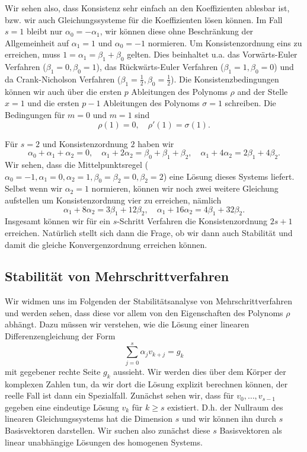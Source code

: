 Wir sehen also, dass Konsistenz sehr einfach an den Koeffizienten ablesbar ist, bzw. wir auch Gleichungssysteme für die Koeffizienten lösen können. Im Fall $s=1$ bleibt nur $\alpha_0 = - \alpha_1$, wir können diese ohne Beschränkung der Allgemeinheit auf $\alpha_1=1$ und $\alpha_0=-1$ normieren. Um Konsistenzordnung eins zu erreichen, muss $1=\alpha_1=\beta_1+\beta_0$ gelten. Dies beinhaltet u.a. das Vorwärts-Euler Verfahren ($\beta_1=0, \beta_0=1$), das Rückwärts-Euler Verfahren ($\beta_1=1, \beta_0=0$) und da Crank-Nicholson Verfahren ($\beta_1=\frac{1}2, \beta_0=\frac{1}2$). Die Konsistenzbedingungen können wir auch über die ersten $p$ Ableitungen des Polynoms $\rho$ and der Stelle $x=1$ und die ersten $p-1$ Ableitungen des Polynoms $\sigma =1$ schreiben. Die Bedingungen für $m=0$ und $m=1$ sind
$$ \rho(1) = 0, \quad \rho'(1) = \sigma(1). $$

Für $s=2$ und Konsistenzordnung $2$ haben wir 
$$ \alpha_0+\alpha_1+\alpha_2 = 0, \quad \alpha_1+2 \alpha_2 = \beta_0+\beta_1+\beta_2 , \quad \alpha_1+4\alpha_2 = 2\beta_1+4\beta_2. $$
Wir sehen, dass die Mittelpunktsregel ($\alpha_0=-1,\alpha_1=0,\alpha_2=1, \beta_0 =\beta_2=0, \beta_2=2$) eine Lösung dieses Systems liefert. Selbst wenn wir $\alpha_2=1$ normieren, können wir noch zwei weitere Gleichung aufstellen um Konsistenzordnung vier zu erreichen, nämlich
$$ \alpha_1 + 8 \alpha_2 = 3 \beta_1 + 12\beta_2, \quad \alpha_1 + 16 \alpha_2 = 4 \beta_1 + 32\beta_2. $$
Insgesamt können wir für ein $s$-Schritt Verfahren die Konsistenzordnung $2s+1$ erreichen. Natürlich stellt sich dann die Frage, ob wir dann auch Stabilität und damit die gleiche Konvergenzordnung erreichen können.

\subsection{Stabilität von Mehrschrittverfahren} 

Wir widmen uns im Folgenden der Stabilitätsanalyse von Mehrschrittverfahren und werden sehen, dass diese vor allem von den Eigenschaften des Polynoms $\rho$ abhängt. Dazu müssen wir verstehen, wie die Lösung einer linearen Differenzengleichung der Form
$$ \sum_{j=0}^s \alpha_j v_{k+j} = g_k $$
mit gegebener rechte Seite $g_k$ aussieht. Wir werden dies über dem Körper der komplexen Zahlen tun, da wir dort die Lösung explizit berechnen können, der reelle Fall ist dann ein Spezialfall.
Zunächst sehen wir, dass für $v_0,\ldots,v_{s-1}$ gegeben eine eindeutige Lösung $v_k$ für $k \geq s$ existiert. D.h. der Nullraum des linearen Gleichungssystems hat die Dimension $s$ und wir können ihn durch $s$ Basisvektoren darstellen. Wir suchen also zunächst diese $s$ Basisvektoren als linear unabhängige Lösungen des homogenen Systems. 

